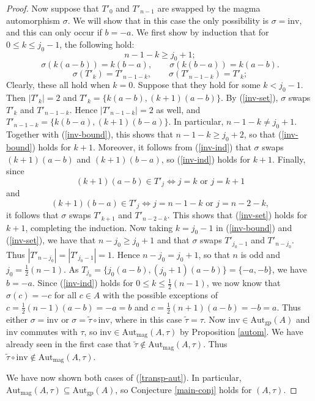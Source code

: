 \documentclass[10pt,a4paper]{amsart}
\numberwithin{equation}{section}
\theoremstyle{definition}
\newcommand{\LRA}{\Leftrightarrow}
\newcommand{\inv}{\mathrm{inv}}
\newcommand{\Autgp}{\mathrm{Aut}_{\mathrm{gp}}}
\newcommand{\Autmag}{\mathrm{Aut}_\mathrm{mag}}
\newcommand{\ttau}{\tilde{\tau}}
\begin{document}
\begin{proof}
Now suppose that $T'_0$ and $T'_{n-1}$ are swapped by the magma automorphism $\sigma$. We will show that in this case the only possibility is $\sigma =\inv$, and this can only occur if $b=-a$. 
We first show by induction that for $0 \leq k \leq j_0-1$, the following hold:
\begin{equation} \label{inv-bound}
	n-1-k \geq j_0+1; 
\end{equation}
\begin{equation} \label{inv-ind}
	\sigma(k(a-b))=k(b-a), \qquad  	\sigma(k(b-a))=k(a-b).
\end{equation}
\begin{equation} \label{inv-set}
	\sigma(T'_k) = T'_{n-1-k}, \qquad \sigma(T'_{n-1-k})=T'_k; 
\end{equation}
Clearly, these all hold when $k=0$. Suppose that they hold for some $k < j_0-1$. Then $|T'_k|=2$ and $T'_k=\{k(a-b), (k+1)(a-b)\}$. By (\ref{inv-set}), $\sigma$ swaps $T'_k$ and $T'_{n-1-k}$. Hence $|T'_{n-1-k}|=2$ as well, and $T'_{n-1-k}=\{k(b-a),(k+1)(b-a)\}$. In particular, $n-1-k \neq j_0+1$. Together with (\ref{inv-bound}), this shows that $n-1-k \geq j_0+2$, so that (\ref{inv-bound}) holds for $k+1$. Moreover, it follows from (\ref{inv-ind}) that $\sigma$ swaps $(k+1)(a-b)$ and $(k+1)(b-a)$, so (\ref{inv-ind}) holds for $k+1$. Finally, since 
$$  (k+1)(a-b) \in T'_j \LRA j=k \mbox{ or } j=k+1 $$
and
$$  (k+1)(b-a) \in T'_j \LRA j=n-1-k \mbox{ or } j= n-2-k, $$
it follows that $\sigma$ swaps $T'_{k+1}$ and $T'_{n-2-k}$. This shows that (\ref{inv-set}) holds for $k+1$, completing the induction. Now taking $k=j_0-1$ in (\ref{inv-bound}) and (\ref{inv-set}), we have that $n-j_0 \geq j_0+1$ and that $\sigma$ swaps $T'_{j_0-1}$ and $T'_{n-j_0}$. Thus $|T'_{n-j_0}|=|T'_{j_0-1}|=1$. Hence $n-j_0=j_0+1$, so that $n$ is odd and $j_0=\frac{1}{2}(n-1)$. As $T_{j_0}=\{j_0(a-b), (j_0+1)(a-b)\}=\{-a,-b\}$, we have $b=-a$. Since (\ref{inv-ind}) holds for $0 \leq k \leq \frac{1}{2}(n-1)$, we now know that $\sigma(c)=-c$ for all $c \in A$ with the possible exceptions of $c=\frac{1}{2}(n-1)(a-b)=-a=b$ and $c=\frac{1}{2}(n+1)(a-b)=-b=a$. Thus either $\sigma=\inv$ or $\sigma=\ttau \circ \inv$, where in this case $\ttau=\tau$. Now $\inv \in \Autgp(A)$ and $\inv$ commutes with $\tau$, so $\inv \in \Autmag(A,\tau)$ by Proposition \ref{autom}. We have already seen in the first case that $\ttau \not \in \Autmag(A,\tau)$. Thus $\ttau \circ \inv \not \in \Autmag(A,\tau)$. 

We have now shown both cases of (\ref{transp-aut}). In particular, $\Autmag(A,\tau) \subseteq \Autgp(A)$, so Conjecture \ref{main-conj} holds for $(A, \tau)$. 
\end{proof}
\end{document}
